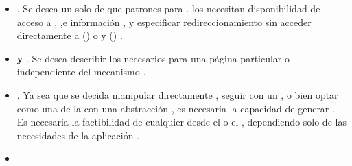 \begin{itemize}
	\item
		\textbf{\routingAS}. Se desea un solo \setPL de \routesPC que \mapCPT patrones \uriNAME para \routePC \handlersAS. los \routePC \handlersAS necesitan disponibilidad de acceso a \httpNAME \headersINT, \cookiesINT,e información \uriNAME, y especificar redireccionamiento sin acceder directamente a \windowLocationINT(\browserINT) o \reqNodeINT y \resNodeINT (\nodejsNAME) \cite{online_isom_js_future_web_apps}.
	\item
		\textbf{\fetchingPC y \persistingPC \dataPC}. Se desea describir los \resourcesCPT necesarios para \renderCPT una página particular o \componentAS independiente del mecanismo \fetchingPC \cite{online_isom_js_future_web_apps}.
	\item
		\textbf{\viewRenderingAS}. Ya sea que se decida manipular directamente \htmldomNAME, seguir con un \templatingAS \htmlNAME \stringBasePL, o bien optar como una de la \componentAS \uiSiglaAS con una abstracción \htmldomNAME, es necesaria la capacidad de generar \markupPL \isomorphicallyAS. Es necesaria la factibilidad de \renderCPT cualquier \viewAS desde el \serverAS o el \clientAS, dependiendo solo de las necesidades de la aplicación \cite{online_isom_js_future_web_apps}.
	\item

\end{itemize}
